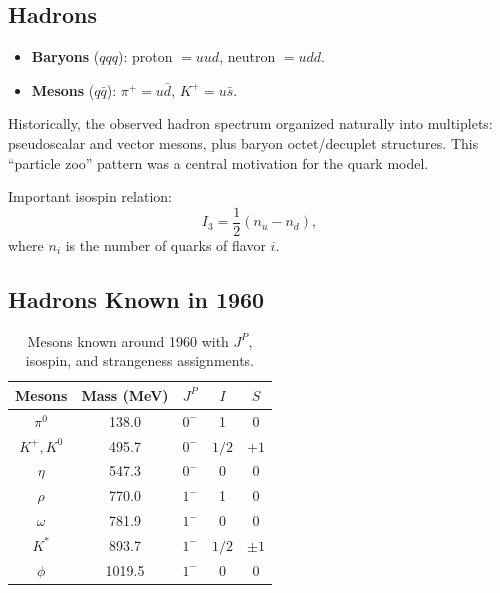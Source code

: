 \documentclass[12pt]{report}
\begin{document}
\subsection{Hadrons}
\begin{itemize}
    \item \textbf{Baryons} ($qqq$): proton $=uud$, neutron $=udd$.
    \item \textbf{Mesons} ($q\bar{q}$): $\pi^+ = u\bar{d}$, $K^+ = u\bar{s}$.
\end{itemize}

Historically, the observed hadron spectrum organized naturally into multiplets: pseudoscalar and vector mesons, plus baryon octet/decuplet structures. This ``particle zoo'' pattern was a central motivation for the quark model.

Important isospin relation:
\begin{equation}
I_3 = \frac{1}{2}(n_u - n_d),
\end{equation}
where $n_i$ is the number of quarks of flavor $i$.

\subsection{Hadrons Known in 1960}
\begin{table}[H]
    \centering
    \caption{Mesons known around 1960 with $J^P$, isospin, and strangeness assignments.}
    \label{tab:mesons-1960}
    \begin{tabular}{|c|c|c|c|c|}
    \hline
    \textbf{Mesons} & \textbf{Mass (MeV)} & \textbf{$J^P$} & \textbf{$I$} & \textbf{$S$} \\
    \hline
    $\pi^0$ & 138.0 & $0^{-}$ & 1 & 0 \\
    \hline
    $K^{+}, K^{0}$ & 495.7 & $0^{-}$ & $1/2$ & $+1$ \\
    \hline
    $\eta$ & 547.3 & $0^{-}$ & 0 & 0 \\
    \hline
    $\rho$ & 770.0 & $1^{-}$ & 1 & 0 \\
    \hline
    $\omega$ & 781.9 & $1^{-}$ & 0 & 0 \\
    \hline
    $K^{*}$ & 893.7 & $1^{-}$ & $1/2$ & $\pm 1$ \\
    \hline
    $\phi$ & 1019.5 & $1^{-}$ & 0 & 0 \\
    \hline
    \end{tabular}
\end{table}
\end{document}

